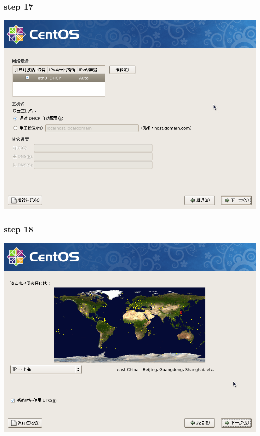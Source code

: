 \documentclass[xcolor=svgnames,presentation]{beamer}
\begin{document}
\begin{frame}
\frametitle{step 17}
\label{sec-2-17}

\begin{center}
\includegraphics[width=.9\linewidth]{img/img25.png}
\end{center}
\end{frame}
\begin{frame}
\frametitle{step 18}
\label{sec-2-18}

\begin{center}
\includegraphics[width=.9\linewidth]{img/img27.png}
\end{center}
\end{frame}
\end{document}
